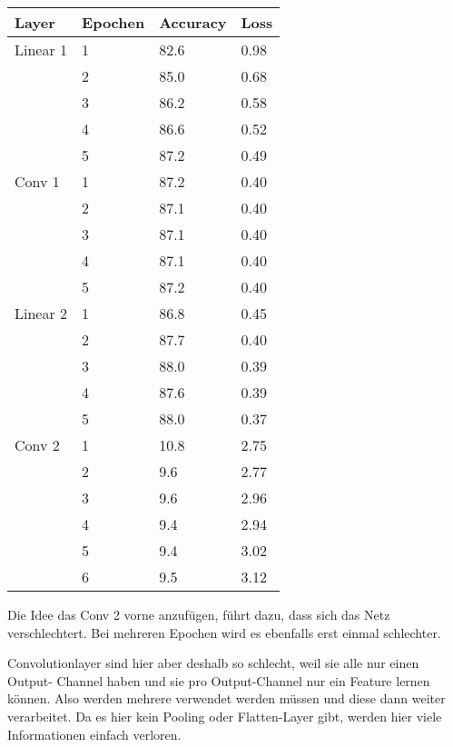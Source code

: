     \begin{table}[h!]
        \begin{tabular}{l|l|l|l}
            Layer & Epochen & Accuracy & Loss \\
            \hline
            Linear 1 & 1 & 82.6 & 0.98 \\
            & 2 & 85.0 & 0.68 \\
            & 3 & 86.2 & 0.58 \\
            & 4 & 86.6 & 0.52 \\
            & 5 & 87.2 & 0.49\\
            Conv 1 & 1 & 87.2 & 0.40 \\
            & 2 & 87.1 & 0.40 \\
            & 3 & 87.1 & 0.40 \\
            & 4 & 87.1 & 0.40 \\
            & 5 & 87.2 & 0.40 \\
            Linear 2 & 1 & 86.8 & 0.45 \\
            & 2 & 87.7 & 0.40 \\
            & 3 & 88.0 & 0.39 \\
            & 4 & 87.6 & 0.39 \\
            & 5 & 88.0 & 0.37 \\
            Conv 2 & 1 & 10.8 & 2.75 \\
            & 2 & 9.6 & 2.77 \\
            & 3 & 9.6 & 2.96 \\
            & 4 & 9.4 & 2.94 \\
            & 5 & 9.4 & 3.02 \\
            & 6 & 9.5 & 3.12 \\
        \end{tabular}
    \end{table}

    Die Idee das Conv 2 vorne anzufügen, führt dazu, dass sich das Netz verschlechtert. 
    Bei mehreren Epochen wird es ebenfalls erst einmal schlechter.


    Convolutionlayer sind hier aber deshalb so schlecht, weil sie alle nur einen Output-
    Channel haben und sie pro Output-Channel nur ein Feature lernen können.
    Also werden mehrere verwendet werden müssen und diese dann weiter verarbeitet. 
    Da es hier kein Pooling oder Flatten-Layer gibt, werden hier viele Informationen 
    einfach verloren.

